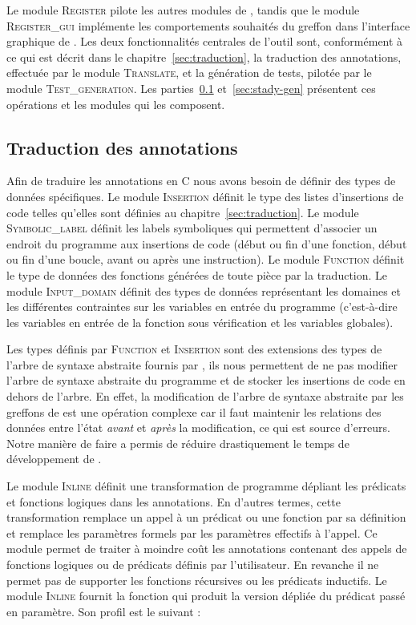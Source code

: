 Le module \textsc{Register} pilote les autres modules de \stady, tandis que le
module \textsc{Register\_gui} implémente les comportements souhaités du greffon
dans l'interface graphique de \framac.
Les deux fonctionnalités centrales de l'outil sont, conformément à ce qui est
décrit dans le chapitre~\ref{sec:traduction}, la traduction des annotations,
effectuée par le module \textsc{Translate}, et la génération de tests, pilotée
par le module \textsc{Test\_generation}.
Les parties~\ref{sec:stady-trad} et~\ref{sec:stady-gen} présentent ces
opérations et les modules qui les composent.


\subsection{Traduction des annotations}
\label{sec:stady-trad}


Afin de traduire les annotations \eacsl en C nous avons besoin de définir des
types de données spécifiques.
Le module \textsc{Insertion} définit le type des listes d'insertions de code
telles qu'elles sont définies au chapitre~\ref{sec:traduction}.
Le module \textsc{Symbolic\_label} définit les labels symboliques qui permettent
d'associer un endroit du programme aux insertions de code (début ou fin d'une
fonction, début ou fin d'une boucle, avant ou après une instruction).
Le module \textsc{Function} définit le type de données des fonctions générées
de toute pièce par la traduction.
Le module \textsc{Input\_domain} définit des types de données représentant les
domaines et les différentes contraintes sur les variables en entrée du
programme (c'est-à-dire les variables en entrée de la fonction sous vérification
et les variables globales).

Les types définis par \textsc{Function} et \textsc{Insertion} sont des
extensions des types de l'arbre de syntaxe abstraite fournis par \framac, ils
nous permettent de ne pas modifier l'arbre de syntaxe abstraite du programme et
de stocker les insertions de code en dehors de l'arbre.
En effet, la modification de l'arbre de syntaxe abstraite par les greffons de
\framac est une opération complexe car il faut maintenir les relations
des données entre l'état {\em avant} et {\em après} la modification, ce qui est
source d'erreurs.
Notre manière de faire a permis de réduire drastiquement le temps de
développement de \stady.

Le module \textsc{Inline} définit une transformation de programme dépliant
les prédicats et fonctions logiques dans les annotations.
En d'autres termes, cette transformation remplace un appel à un prédicat ou une
fonction par sa définition et remplace les paramètres formels par les paramètres
effectifs à l'appel.
Ce module permet de traiter à moindre coût les annotations contenant des appels
de fonctions logiques ou de prédicats définis par l'utilisateur.
En revanche il ne permet pas de supporter les fonctions récursives ou les
prédicats inductifs.
Le module \textsc{Inline} fournit la fonction 
qui produit la version dépliée du prédicat passé en paramètre.
Son profil est le suivant :

